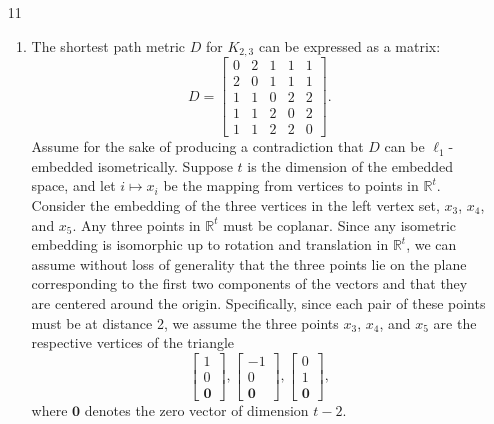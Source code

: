 \documentclass{article}
\newcommand{\R}{\mathbb{R}}
\newcommand{\0}{\mathbf{0}}
\begin{document}
\begin{enumerate}
    \item[11]
      \begin{enumerate}
      \item
        The shortest path metric $D$ for $K_{2,3}$ can be expressed as a matrix:
        \begin{equation*}
          D =
          \begin{bmatrix}
            0 & 2 & 1 & 1 & 1 \\
            2 & 0 & 1 & 1 & 1 \\
            1 & 1 & 0 & 2 & 2 \\
            1 & 1 & 2 & 0 & 2 \\
            1 & 1 & 2 & 2 & 0
          \end{bmatrix}
          .
        \end{equation*}
        Assume for the sake of producing a contradiction that $D$ can be $\ell_1$-embedded isometrically.
        Suppose $t$ is the dimension of the embedded space, and let $i \mapsto x_i$ be the mapping from vertices to points in $\R^t$.
        Consider the embedding of the three vertices in the left vertex set, $x_3$, $x_4$, and $x_5$.
        Any three points in $\R^t$ must be coplanar.
        Since any isometric embedding is isomorphic up to rotation and translation in $\R^t$, we can assume without loss of generality that the three points lie on the plane corresponding to the first two components of the vectors and that they are centered around the origin.
        Specifically, since each pair of these points must be at distance 2, we assume the three points $x_3$, $x_4$, and $x_5$ are the respective vertices of the triangle
        \begin{equation*}
          \begin{bmatrix}
            1 \\ 0 \\ \0
          \end{bmatrix},
          \begin{bmatrix}
            -1 \\ 0 \\ \0
          \end{bmatrix},
          \begin{bmatrix}
            0 \\ 1 \\ \0
          \end{bmatrix},
        \end{equation*}
        where $\0$ denotes the zero vector of dimension $t - 2$.


\end{enumerate}
\end{enumerate}
\end{document}
